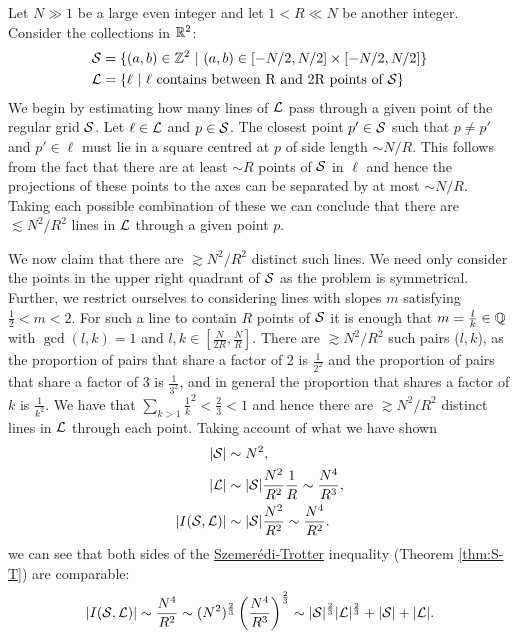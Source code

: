 \begin{example}
    Let $N \gg 1$ be a large even integer and let $1<R \ll N$ be another integer. Consider the collections in $\mathbb R^2$:
    \begin{align*}
        \mathcal S &= \{ (a,b) \in \mathbb Z^2 \ | \ (a,b) \in [-N/2,N/2] \times [-N/2,N/2] \} \\
        \mathcal L &= \{ \ell \ | \ \ell \text{ contains between R and 2R points of } \mathcal S \} \end{align*}
    We begin by estimating how many lines of $\mathcal L$ pass through a given point of the regular grid $\mathcal S$.
    Let $\ell \in \mathcal L$ and $p \in \mathcal S$. The closest point $p' \in \mathcal S$ such that $p \neq p'$ and $p' \in \ell$ must lie
    in a square centred at $p$ of side length $\sim N/R$. This follows from the fact that there are at least $\sim R$ points of $\mathcal S$ in $\ell$ and hence the
    projections of these points to the axes can be separated by at most $\sim N/R$. Taking each possible combination of these we can conclude that there are $\lesssim N^2 / R^2$ lines in $\mathcal L$ through a
    given point $p$.

    We now claim that there are $\gtrsim N^2 / R^2$ distinct such lines. We need only consider the points in the upper right quadrant of $\mathcal S$ as the problem is symmetrical.
    Further, we restrict ourselves to considering lines with slopes $m$ satisfying $\frac{1}{2} < m < 2$. For such a line to contain $R$  points
    of $\mathcal S$ it is enough that $m= \frac{l}{k} \in \mathbb Q$ with $\gcd(l,k) =1$ and $l,k \in \left[\frac{N}{2R}, \frac{N}{R} \right]$. There are $\gtrsim N^2/R^2$ such pairs ($l,k$), as the proportion of pairs that share a factor of 2 is $\frac{1}{2^2}$ and the proportion of pairs that share a factor 
    of 3 is $\frac{1}{3^2}$, and in general the proportion that shares a factor of $k$ is $\frac{1}{k^2}$. We have that $\sum_{k>1} \frac{1}{k}^2 < \frac{2}{3} < 1$ and hence there are $\gtrsim N^2 /R^2$ distinct
    lines in $\mathcal L$ through each point. Taking account of what we have shown
    \begin{align*}
        |\mathcal S| &\sim N^2, \\ 
        |\mathcal L| &\sim |\mathcal S| \frac{N^2}{R^2} \frac{1}{R} \sim \frac{N^4}{R^3},\\
        |I(\mathcal S, \mathcal L)| &\sim |\mathcal S| \frac{N^2}{R^2} \sim \frac{N^4}{R^2}.\\
    \end{align*}
    we can see that both sides of the \hyperref[thm:S-T]{Szemerédi-Trotter} inequality (Theorem \ref{thm:S-T}) are comparable:
    \[
    |I(\mathcal S, \mathcal L)| \sim \frac{N^4}{R^2} \sim (N^2)^{\frac{2}{3}} \left(\frac{N^4}{R^3}\right)^{\frac{2}{3}} \sim |\mathcal S|^{\frac{2}{3}}|\mathcal L|^{\frac{2}{3}} + |\mathcal S| + |\mathcal L|.
    \]
\end{example}




